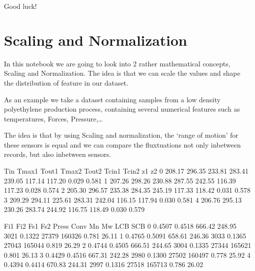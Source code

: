 \documentclass[letterpaper,10pt,english]{jupyterBook}
\begin{document}
\sphinxAtStartPar
Good luck!


\chapter{Scaling and Normalization}
\label{\detokenize{c2_data_preparation/scaling_normalization:scaling-and-normalization}}\label{\detokenize{c2_data_preparation/scaling_normalization::doc}}
\sphinxAtStartPar
In this notebook we are going to look into 2 rather mathematical concepts, Scaling and Normalization.
The idea is that we can scale the values and shape the distribution of feature in our dataset.

\sphinxAtStartPar
As an example we take a dataset containing samples from a low density polyethylene production process, containing several numerical features such as temperatures, Forces, Pressure,…

\sphinxAtStartPar
The idea is that by using Scaling and normalization, the ‘range of motion’ for these sensors is equal and we can compare the fluxtuations not only inbetween records, but also inbetween sensors.

\begin{sphinxVerbatim}[commandchars=\\\{\}]
   
\end{sphinxVerbatim}

\begin{sphinxVerbatim}[commandchars=\\\{\}]
  \PYG{p}{[}\PYG{p}{]}
\end{sphinxVerbatim}

\begin{sphinxVerbatim}[commandchars=\\\{\}]
      Tin   Tmax1   Tout1   Tmax2   Tout2   Tcin1   Tcin2     z1     z2  \PYGZbs{}
0  208.17  296.35  233.81  283.41  239.05  117.14  117.20  0.029  0.581   
1  207.26  298.26  230.88  287.55  242.55  116.39  117.23  0.028  0.574   
2  205.30  296.57  235.38  284.35  245.19  117.33  118.42  0.031  0.578   
3  209.29  294.11  225.61  283.31  242.04  116.15  117.94  0.030  0.581   
4  206.76  295.13  230.26  283.74  244.92  116.75  118.49  0.030  0.579   

      Fi1     Fi2     Fs1     Fs2  Press    Conv     Mn      Mw    LCB    SCB  
0  0.4507  0.4518  666.42  248.95   3021  0.1322  27379  160326  0.781  26.11  
1  0.4765  0.5091  658.61  246.36   3033  0.1365  27043  165044  0.819  26.29  
2  0.4744  0.4505  666.51  244.65   3004  0.1335  27344  165621  0.801  26.13  
3  0.4429  0.4516  667.31  242.28   2980  0.1300  27502  160497  0.778  25.92  
4  0.4394  0.4414  670.83  244.31   2997  0.1316  27518  165713  0.786  26.02  
\end{sphinxVerbatim}
\end{document}
